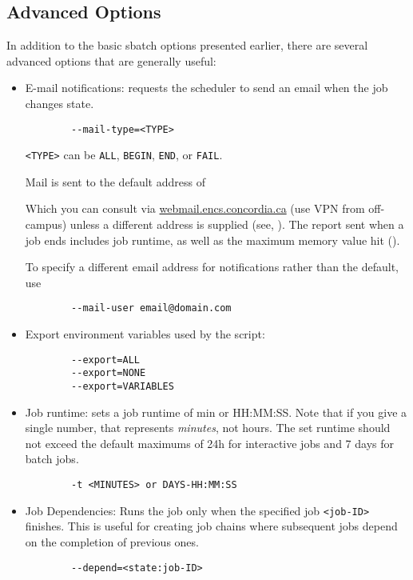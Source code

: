 \subsection{Advanced  Options}
\label{sect:submit-options}

In addition to the basic sbatch options presented earlier,
there are several advanced options that are generally useful:

\begin{itemize}
	\item E-mail notifications: requests the scheduler to send an email when the job changes state.
	\begin{verbatim}
		--mail-type=<TYPE>
	\end{verbatim}
	\texttt{<TYPE>} can be \texttt{ALL}, \texttt{BEGIN}, \texttt{END}, or \texttt{FAIL}.

	Mail is sent to the default address of 

	Which you can consult via \url{webmail.encs.concordia.ca} (use VPN from off-campus)
	unless a different address is supplied (see, ). The report sent when
    a job ends includes job runtime, as well as the maximum memory value hit ().

    To specify a different email address for notifications rather than the default, use
    \begin{verbatim}
		--mail-user email@domain.com
	\end{verbatim}

	\item Export environment variables used by the script:
	\begin{verbatim}
		--export=ALL
		--export=NONE
		--export=VARIABLES
	\end{verbatim}

	\item Job runtime: sets a job runtime of min or HH:MM:SS. Note that if you give a single number,
	that represents \emph{minutes}, not hours. The set runtime should not exceed
	the default maximums of 24h for interactive jobs and 7 days for batch jobs.
	\begin{verbatim}
		-t <MINUTES> or DAYS-HH:MM:SS
	\end{verbatim}

	\item Job Dependencies: Runs the job only when the specified job \verb|<job-ID>| finishes.
    This is useful for creating job chains where subsequent jobs depend on the completion of previous ones.
	\begin{verbatim}
		--depend=<state:job-ID>
	\end{verbatim}
\end{itemize}

